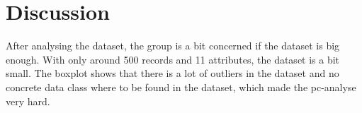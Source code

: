 \section{Discussion}
After analysing the dataset, the group is a bit concerned if the dataset is big enough. With only around 500 records and 11 attributes, the dataset is a bit small. The boxplot shows that there is a lot of outliers in the dataset and no concrete data class where to be found in the dataset, which made the pc-analyse very hard. 